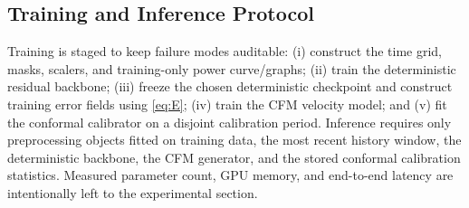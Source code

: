 \documentclass[journal]{IEEEtran}
\newcommand{\1}{\mathbb{I}}
\begin{document}
\subsection{Training and Inference Protocol}
Training is staged to keep failure modes auditable: (i) construct the time grid, masks, scalers, and training-only power curve/graphs; (ii) train the deterministic residual backbone; (iii) freeze the chosen deterministic checkpoint and construct training error fields using \eqref{eq:E}; (iv) train the CFM velocity model; and (v) fit the conformal calibrator on a disjoint calibration period. Inference requires only preprocessing objects fitted on training data, the most recent history window, the deterministic backbone, the CFM generator, and the stored conformal calibration statistics. Measured parameter count, GPU memory, and end-to-end latency are intentionally left to the experimental section.
\end{document}
